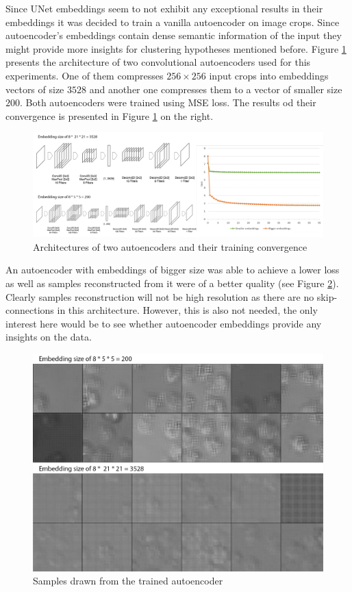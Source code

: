 Since UNet embeddings seem to not exhibit any exceptional results in their embeddings it was decided to train a vanilla autoencoder on image crops. Since autoencoder's embeddings contain dense semantic information of the input they might provide more insights for clustering hypotheses mentioned before. Figure \ref{fig:ae-training} presents the architecture of two convolutional autoencoders used for this experiments. One of them compresses $256 \times 256$ input crops into embeddings vectors of size $3528$ and another one compresses them to a vector of smaller size $200$. Both autoencoders were trained using MSE loss. The results od their convergence is presented in Figure \ref{fig:ae-training} on the right.

\begin{figure}[H]
	\begin{center}
		\includegraphics[width=\linewidth]{bilder/ae-embeddings/training-architectures.png}
		\caption{Architectures of two autoencoders and their training convergence}\label{fig:ae-training}
	\end{center}
\end{figure}

An autoencoder with embeddings of bigger size was able to achieve a lower loss as well as samples reconstructed from it were of a better quality (see Figure \ref{fig:ae-samples}). Clearly samples reconstruction will not be high resolution as there are no skip-connections in this architecture. However, this is also not needed, the only interest here would be to see whether autoencoder embeddings provide any insights on the data.
\begin{figure}[H]
	\begin{center}
		\includegraphics[width=0.5\linewidth]{bilder/ae-embeddings/ae-samples.png}
		\caption{Samples drawn from the trained autoencoder}
		\label{fig:ae-samples}
	\end{center}
\end{figure}

